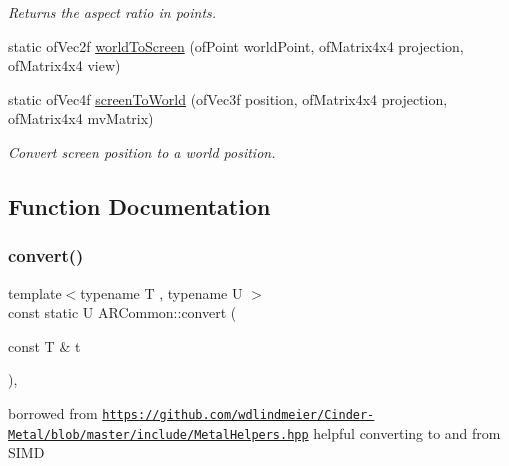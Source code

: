 \begin{DoxyCompactItemize}
\begin{DoxyCompactList}\small\item\em Returns the aspect ratio in points. \end{DoxyCompactList}\item 
static of\+Vec2f \hyperlink{namespace_a_r_common_a9cd9f43005e2612ab5054dc3aec90fcf}{world\+To\+Screen} (of\+Point world\+Point, of\+Matrix4x4 projection, of\+Matrix4x4 view)
\item 
static of\+Vec4f \hyperlink{namespace_a_r_common_acc8f469a4596dc7173993ce58068bd2d}{screen\+To\+World} (of\+Vec3f position, of\+Matrix4x4 projection, of\+Matrix4x4 mv\+Matrix)
\begin{DoxyCompactList}\small\item\em Convert screen position to a world position. \end{DoxyCompactList}\end{DoxyCompactItemize}


\subsection{Function Documentation}
\mbox{\label{namespace_a_r_common_ab67b42b84c068f0c4ab2401ea3af86c6}} 
\subsubsection{\texorpdfstring{convert()}{convert()}}
{\footnotesize\ttfamily template$<$typename T , typename U $>$ \\
const static U A\+R\+Common\+::convert (\begin{DoxyParamCaption}\item[{const T \&}]{t }\end{DoxyParamCaption})\hspace{0.3cm}{\ttfamily [inline]}, {\ttfamily [static]}}

borrowed from \href{https://github.com/wdlindmeier/Cinder-Metal/blob/master/include/MetalHelpers.hpp}{\tt https\+://github.\+com/wdlindmeier/\+Cinder-\/\+Metal/blob/master/include/\+Metal\+Helpers.\+hpp} helpful converting to and from S\+I\+MD \mbox{\label{namespace_a_r_common_a5a232f6315a3a5b74678034efadd5d20}} 
